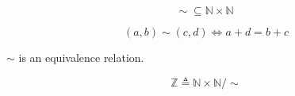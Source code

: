 \begin{frame}{}
  \begin{definition}
    \[
      \sim\; \subseteq \mathbb{N} \times \mathbb{N}
    \]

    \[
      (a, b) \sim (c, d) \iff a + d = b + c
    \]
  \end{definition}

  \pause
  \vspace{0.30cm}
  \begin{theorem}
    $\sim$ is an equivalence relation.
  \end{theorem}

  \pause
  \vspace{0.30cm}
  \begin{center}
  \end{center}

  \pause
  \begin{definition}
    \[
      \mathbb{Z} \triangleq \mathbb{N} \times \mathbb{N}/\sim
    \]
  \end{definition}
\end{frame}
